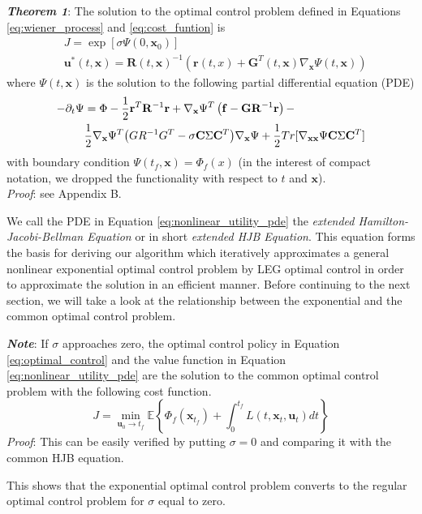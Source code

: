 \documentclass[letterpaper, 10 pt, conference]{ieeeconf}
\newcommand{\vf}{\mathbf f}
\newcommand{\vr}{\mathbf r}
\newcommand{\vu}{\mathbf u}
\newcommand{\vx}{\mathbf x}
\newcommand{\vC}{\mathbf C}
\newcommand{\vG}{\mathbf G}
\newcommand{\vR}{\mathbf R}
\begin{document}
\textbf{\textit{Theorem 1}}: The solution to the optimal control problem defined
in Equations \eqref{eq:wiener_process} and \eqref{eq:cost_funtion} is
\begin{align}
& J = \exp \left[ \sigma \Psi(0,\vx_0) \right] \\
&\vu^*(t,\vx) =  \vR(t,\vx)^{-1} \left( \vr(t,x) + \vG^T(t,\vx) \nabla_{\vx}\Psi(t,\vx) \right)
\label{eq:optimal_control}
\end{align}
where $\Psi(t,\vx)$ is the solution to the following partial differential equation (PDE)
\begin{align} \label{eq:nonlinear_utility_pde}
- \partial_t\Psi &= \Phi -\frac{1}{2}\vr^T \vR^{-1} \vr + \nabla_{\vx}\Psi^T \left( \vf - \vG\vR^{-1}\vr \right) - \notag \\
&  \frac{1}{2} \nabla_{\vx}\Psi^T \big(  GR^{-1}G^T - \sigma \vC\Sigma\vC^T \big) \nabla_{\vx}\Psi + \frac{1}{2} Tr [\nabla_{\vx\vx}\Psi \vC\Sigma\vC^T]
\end{align}
with boundary condition $\Psi(t_f,\vx) = \Phi_f(x)$ (in the interest
of compact notation, we dropped the functionality with respect to $t$ and $\vx$). \\
\textit{Proof}: see Appendix B.

We call the PDE in Equation \eqref{eq:nonlinear_utility_pde} the \emph{extended
Hamilton-Jacobi-Bellman Equation} or in short \emph{extended HJB Equation}.
This equation forms the basis for deriving our algorithm which iteratively
approximates a general nonlinear exponential optimal control problem by LEG
optimal control  in order to approximate the solution in an efficient manner.
Before continuing to the next section, we will take a look at the relationship
between the exponential and the common optimal control problem.

\textbf{\textit{Note}}: If $\sigma$ approaches zero, the optimal control
policy in Equation \eqref{eq:optimal_control} and the value function in Equation
\eqref{eq:nonlinear_utility_pde} are the solution to the common optimal control
problem with the following cost function.
\begin{equation}
J = \min\limits_{ \vu_0 \to t_f} \mathbb{E}\left\{  \Phi_f(\vx_{t_f})+ \int_0^{t_f} { L(t,\vx_t,\vu_t)dt} \right\}
\end{equation}
\textit{Proof}: This can be easily verified by putting $\sigma=0$ and comparing
it with the common HJB equation.

This shows that the exponential optimal control problem converts to the regular
optimal control problem for $\sigma$ equal to zero.
\end{document}
